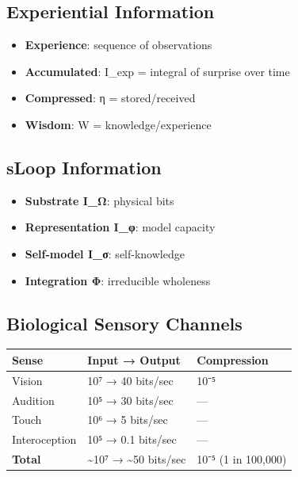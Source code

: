 \documentclass[
  11pt,
  letterpaper,
  twoside,
  openany]{book}
\makeatletter
\providecommand{\tightlist}{%
  \setlength{\itemsep}{0pt}\setlength{\parskip}{0pt}}
\let\orig@subsection\subsection
\renewcommand{\subsection}{\needspace{6\baselineskip}\orig@subsection}
\makeatother
\begin{document}
\subsection{Experiential Information}\label{experiential-information}

\begin{itemize}
\tightlist
\item
  \textbf{Experience}: sequence of observations
\item
  \textbf{Accumulated}: I\_exp = integral of surprise over time
\item
  \textbf{Compressed}: η = stored/received
\item
  \textbf{Wisdom}: W = knowledge/experience
\end{itemize}

\subsection{sLoop Information}\label{sloop-information}

\begin{itemize}
\tightlist
\item
  \textbf{Substrate I\_Ω}: physical bits
\item
  \textbf{Representation I\_φ}: model capacity
\item
  \textbf{Self-model I\_σ}: self-knowledge
\item
  \textbf{Integration Φ}: irreducible wholeness
\end{itemize}

\subsection{Biological Sensory
Channels}\label{biological-sensory-channels-1}

\begin{longtable}[]{@{}lll@{}}
\toprule\noalign{}
Sense & Input → Output & Compression \\
\midrule\noalign{}
\endhead
\bottomrule\noalign{}
\endlastfoot
Vision & 10⁷ → 40 bits/sec & 10⁻⁵ \\
Audition & 10⁵ → 30 bits/sec & --- \\
Touch & 10⁶ → 5 bits/sec & --- \\
Interoception & 10⁵ → 0.1 bits/sec & --- \\
\textbf{Total} & \textasciitilde10⁷ → \textasciitilde50 bits/sec & 10⁻⁵
(1 in 100,000) \\
\end{longtable}
\end{document}
